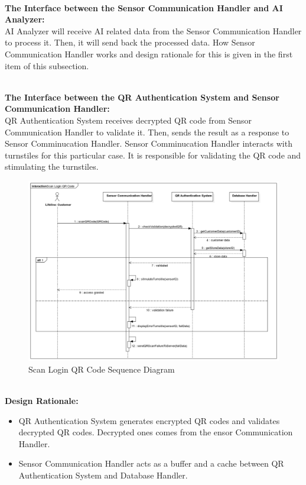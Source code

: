 \documentclass[11pt]{article}
\begin{document}
    \textbf{\\The Interface between the Sensor Communication Handler and AI Analyzer:\\}
    AI Analyzer will receive AI related data from the Sensor Communication Handler to process it. Then, it will send back the processed data. 
    How Sensor Communication Handler works and design rationale for this is given in the first item of this subsection. 
    
    \textbf{\\The Interface between the QR Authentication System and Sensor Communication Handler:\\}
    QR Authentication System receives decrypted QR code from Sensor Communication Handler to validate it. Then, sends the result as a response to Sensor Comminucation Handler.
    Sensor Comminucation Handler interacts with turnstiles for this particular case. It is responsible for validating the QR code and stimulating the turnstiles. 
    \begin{center}
        \begin{figure}[H]
            \includegraphics[width=\linewidth]{Images/ScanLoginQRCodeSeq.png}  %
            \caption{Scan Login QR Code Sequence Diagram}
            \label{QRscan}
        \end{figure}
    \end{center}
   
    \textbf{\\Design Rationale:}
    \begin{itemize}
        \item QR Authentication System generates encrypted QR codes and validates decrypted QR codes. Decrypted ones comes from the ensor Communication Handler.
        \item Sensor Communication Handler acts as a buffer and a cache between QR Authentication System and Database Handler. 
    \end{itemize}
\end{document}
